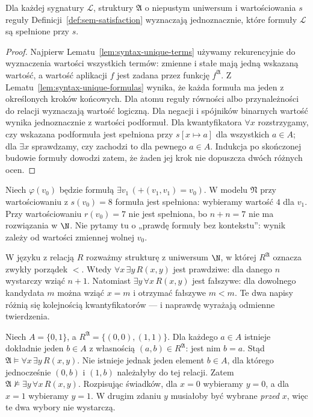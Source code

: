 \begin{stwierdzenie}
\label{prop:sem-uniqueness-xlv}
Dla każdej sygnatury $\mathcal L$, struktury $\mathfrak A$
o niepustym uniwersum i wartościowania $s$ reguły
Definicji~\ref{def:sem-satisfaction} wyznaczają jednoznacznie,
które formuły $\mathcal L$ są spełnione przy $s$.
\end{stwierdzenie}
\begin{proof}
Najpierw Lematu~\ref{lem:syntax-unique-terms} używamy
rekurencyjnie do wyznaczenia wartości wszystkich termów:
zmienne i stałe mają jedną wskazaną wartość, a wartość
aplikacji $f$ jest zadana przez funkcję $f^{\mathfrak A}$.
Z Lematu~\ref{lem:syntax-unique-formulas} wynika, że
każda formuła ma jeden z określonych kroków końcowych.
Dla atomu reguły równości albo przynależności do relacji
wyznaczają wartość logiczną. Dla negacji i spójników
binarnych wartość wynika jednoznacznie z wartości
podformuł. Dla kwantyfikatora $\forall x$ rozstrzygamy,
czy wskazana podformuła jest spełniona przy
$s[x\mapsto a]$ dla wszystkich $a\in A$; dla $\exists x$
sprawdzamy, czy zachodzi to dla pewnego $a\in A$.
Indukcja po skończonej budowie formuły dowodzi zatem,
że żaden jej krok nie dopuszcza dwóch różnych ocen.
\end{proof}

\begin{przyklad}
Niech $\varphi(v_0)$ będzie formułą
$\exists v_1\,(+(v_1,v_1)=v_0)$.
W modelu $\mathfrak N$ przy wartościowaniu z $s(v_0)=8$
formuła jest spełniona: wybieramy wartość $4$ dla $v_1$.
Przy wartościowaniu $r(v_0)=7$ nie jest spełniona,
bo $n+n=7$ nie ma rozwiązania w $\N$.
Nie pytamy tu o „prawdę formuły bez kontekstu”: wynik zależy
od wartości zmiennej wolnej $v_0$.
\end{przyklad}

\begin{przyklad}
W języku z relacją $R$ rozważmy strukturę z uniwersum $\N$,
w której $R^{\mathfrak A}$ oznacza zwykły porządek $<$.
Wtedy $\forall x\,\exists y\,R(x,y)$ jest prawdziwe:
dla danego $n$ wystarczy wziąć $n+1$.
Natomiast $\exists y\,\forall x\,R(x,y)$ jest fałszywe:
dla dowolnego kandydata $m$ można wziąć $x=m$ i otrzymać
fałszywe $m<m$. Te dwa napisy różnią się kolejnością kwantyfikatorów
— i naprawdę wyrażają odmienne twierdzenia.
\end{przyklad}

\begin{przyklad}
Niech $A=\{0,1\}$, a $R^{\mathfrak A}=\{(0,0),(1,1)\}$.
Dla każdego $a\in A$ istnieje dokładnie jeden $b\in A$
z własnością $(a,b)\in R^{\mathfrak A}$: jest nim $b=a$.
Stąd $\mathfrak A\models\forall x\,\exists y\,R(x,y)$.
Nie istnieje jednak jeden element $b\in A$, dla którego
jednocześnie $(0,b)$ i $(1,b)$ należałyby do tej relacji.
Zatem $\mathfrak A\not\models\exists y\,\forall x\,R(x,y)$.
Rozpisując świadków, dla $x=0$ wybieramy $y=0$,
a dla $x=1$ wybieramy $y=1$. W drugim zdaniu $y$ musiałoby
być wybrane \emph{przed} $x$, więc te dwa wybory nie wystarczą.
\end{przyklad}



